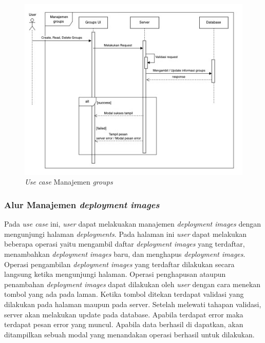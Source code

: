 \begin{figure}[ht]
  \centering
  \includegraphics[width=1\textwidth]{resources/chapter-3/usecase/uc-09.jpg}
  \caption{\textit{Use case} Manajemen \textit{groups}}
  \label{fig:usecase-09}
\end{figure}

\pagebreak

\subsubsection{Alur Manajemen \textit{deployment images}}

Pada \textit{use case} ini, \textit{user} dapat melakuakan manajemen \textit{deployment images} dengan mengunjungi halaman \textit{deployments}. Pada halaman ini \textit{user} dapat melakukan beberapa operasi yaitu mengambil daftar \textit{deployment images} yang terdaftar, menambahkan \textit{deployment images} baru, dan menghapus \textit{deployment images}. Operasi pengambilan \textit{deployment images} yang terdaftar dilakukan secara langsung ketika mengunjungi halaman. Operasi penghapusan ataupun penambahan \textit{deployment images} dapat dilakukan oleh \textit{user} dengan cara menekan tombol yang ada pada laman. Ketika tombol ditekan terdapat validasi yang dilakukan pada halaman maupun pada server. Setelah melewati tahapan validasi, server akan melakukan update pada database. Apabila terdapat error maka terdapat pesan error yang muncul. Apabila data berhasil di dapatkan, akan ditampilkan sebuah modal yang menandakan operasi berhasil untuk dilakukan.

